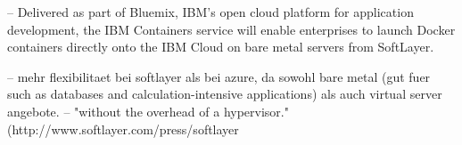 \documentclass[../main.tex]{subfiles}
\begin{document}
    -- Delivered as part of Bluemix, IBM’s open cloud platform for application development, the IBM Containers service will enable enterprises to launch Docker containers directly onto the IBM Cloud on bare metal servers from SoftLayer.

    -- mehr flexibilitaet bei softlayer als bei azure, da sowohl bare metal (gut fuer  such as databases and calculation-intensive applications) als auch virtual server angebote.
    -- "without the overhead of a hypervisor." (http://www.softlayer.com/press/softlayer%
    \cite{http://www.softlayer.com/BARE-METAL-SERVERS ... und ein tab weiter}









\end{document}

